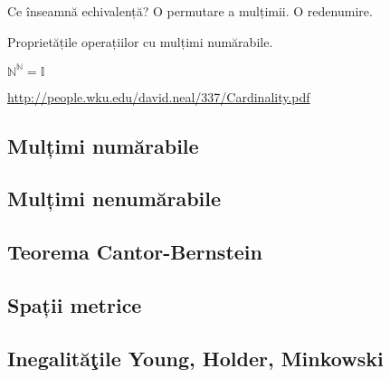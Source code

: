 \documentclass[a4paper,12pt]{article}
\theoremstyle{change}
\begin{document}

Ce înseamnă echivalență? O permutare a mulțimii. O redenumire.

Proprietățile operațiilor cu mulțimi numărabile.

$\mathbb{N}^\mathbb{N}=\mathbb{I}$
 

\url{http://people.wku.edu/david.neal/337/Cardinality.pdf}

\subsection{Mulțimi numărabile}

\subsection{Mulțimi nenumărabile}



\subsection{Teorema Cantor-Bernstein}


\subsection{Spații metrice}

\subsection{Inegalităţile Young, Holder, Minkowski}
\end{document}
